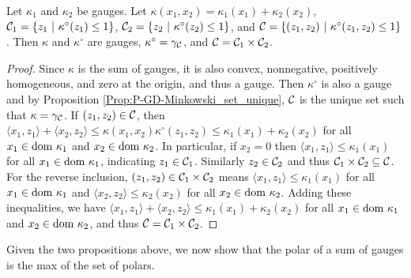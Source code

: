 \begin{prop} 			\label{Prop:P-GD-polar_of_sum_of_gauges_sets_equal}
Let $\kappa_1$ and $\kappa_2$ be gauges.  Let $\kappa(x_1, x_2) = \kappa_1(x_1) + \kappa_2(x_2)$, ${\mathcal C}_1 = \{ z_1 \ | \ \kappa^\circ(z_1) \leq 1 \}$, $\caC_2 = \{ z_2 \ | \ \kappa^\circ(z_2) \leq 1 \}$, and ${\mathcal C} = \{ (z_1, z_2) \ | \ \kappa^\circ(z_1, z_2) \leq 1 \}$. Then $\kappa$ and $\kappa^\circ$ are gauges, $\kappa^\circ = \gamma_{\mathcal C}$, and ${\mathcal C} = {\mathcal C}_1 \times {\mathcal C}_2$.
\end{prop}
\begin{proof}
Since $\kappa$ is the sum of gauges, it is also convex, nonnegative, positively homogeneous, and zero at the origin, and thus a gauge.  Then $\kappa^\circ$ is also a gauge and by Proposition \ref{Prop:P-GD-Minkowski_set_unique}, ${\mathcal C}$ is the unique set such that $\kappa = \gamma_{\mathcal C}$.
If $(z_1, z_2) \in {\mathcal C}$, then $\langle x_1, z_1 \rangle + \langle x_2, z_2 \rangle \leq \kappa(x_1,x_2)\kappa^\circ(z_1,z_2) \leq  \kappa_1(x_1) + \kappa_2 (x_2)$ for all $x_1 \in \textnormal{dom}\ \kappa_1$ and $x_2 \in \textnormal{dom} \ \kappa_2$.  In particular, if $x_2 = 0$ then $\langle x_1, z_1 \rangle \leq \kappa_1(x_1)$ for all $x_1  \in \textnormal{dom}\ \kappa_1$, indicating $z_1 \in {\mathcal C}_1$.  Similarly $z_2 \in {\mathcal C}_2$ and thus ${\mathcal C}_1 \times {\mathcal C}_2 \subseteq {\mathcal C}$.  For the reverse inclusion, $(z_1, z_2) \in {\mathcal C}_1 \times {\mathcal C}_2$ means $\langle x_1, z_1 \rangle \leq \kappa_1(x_1)$ for all $x_1 \in \textnormal{dom}\ \kappa_1$ and $\langle x_2, z_2 \rangle \leq \kappa_2(x_2)$ for all $x_2 \in \textnormal{dom}\ \kappa_2$.  Adding these inequalities, we have $\langle x_1, z_1 \rangle + \langle x_2, z_2 \rangle \leq \kappa_1(x_1) + \kappa_2 (x_2)$ for all $x_1 \in \textnormal{dom}\ \kappa_1$ and $x_2  \in \textnormal{dom}\ \kappa_2$, and thus ${\mathcal C} = {\mathcal C}_1 \times {\mathcal C}_2$.
\end{proof}


Given the two propositions above, we now show that the polar of a sum of gauges is the max of the set of polars.

